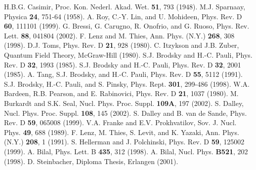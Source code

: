 \documentclass[a4paper,twocolumn,eqsecnum,aps]{revtex4}
\begin{document}
\begin{references} 
 H.B.G. Casimir, Proc. Kon. Nederl. Akad. Wet. {\bf 51}, 793 (1948).
 M.J. Sparnaay, Physica {\bf 24}, 751-64 (1958).
 A. Roy, C.-Y. Lin, and U. Mohideen, Phys. Rev. D {\bf 60}, 111101 (1999).
 G. Bressi, G. Carugno, R. Onofrio, and G. Ruoso, Phys. Rev. Lett. {\bf 88}, 041804 (2002).
 F. Lenz and M. Thies, Ann. Phys. (N.Y.) {\bf 268}, 308 (1998).
 D.J. Toms, Phys. Rev. D {\bf 21}, 928 (1980).
 C. Itzykson and J.B. Zuber, Quantum Field Theory, McGraw-Hill (1980).
 S.J. Brodsky and H.-C. Pauli, Phys. Rev. D {\bf 32}, 1993 (1985). 
 S.J. Brodsky and H.-C. Pauli, Phys. Rev. D {\bf 32}, 2001 (1985).
 A. Tang, S.J. Brodsky, and H.-C. Pauli, Phys. Rev. D {\bf 55}, 5112 (1991).
 S.J. Brodsky, H.-C. Pauli, and S. Pinsky, Phys. Rept. {\bf 301}, 299-486 (1998).
 W.A. Bardeen, R.B. Pearson, and E. Rabinovici, Phys. Rev. D {\bf 21}, 1037 (1980).
 M. Burkardt and S.K. Seal, Nucl. Phys. Proc. Suppl. {\bf 109A}, 197 (2002).
 S. Dalley, Nucl. Phys. Proc. Suppl. {\bf 108}, 145 (2002). 
 S. Dalley and B. van de Sande, Phys. Rev. D {\bf 59}, 065008 (1999).
 V.A. Franke and E.V. Prokhvatilov, Sov. J. Nucl. Phys. {\bf 49}, 688 (1989).
 F. Lenz, M. Thies, S. Levit, and K. Yazaki, Ann. Phys. (N.Y.) {\bf 208}, 1 (1991).
 S. Hellerman and J. Polchinski, Phys. Rev. D {\bf 59}, 125002 (1999).
 A. Bilal, Phys. Lett. B {\bf 435}, 312 (1998).
 A. Bilal, Nucl. Phys. {\bf B521}, 202 (1998).
 D. Steinbacher, Diploma Thesis, Erlangen (2001).



\end{references}          
 
\end{document}

